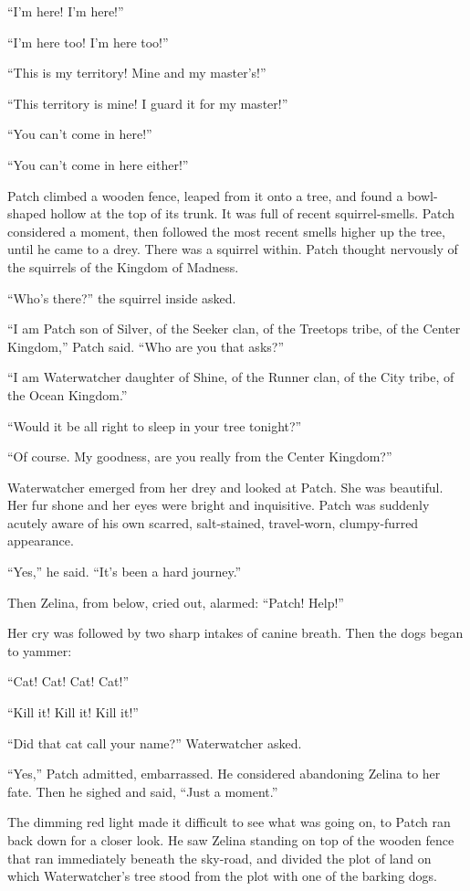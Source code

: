 \documentclass[ebook,oneside,openany,12pt]{memoir}
\begin{document}
“I’m here! I’m here!”

“I’m here too! I’m here too!”

“This is my territory! Mine and my master’s!”

“This territory is mine! I guard it for my master!”

“You can’t come in here!”

“You can’t come in here either!”

Patch climbed a wooden fence, leaped from it onto a tree, and found a
bowl-shaped hollow at the top of its trunk. It was full of recent
squirrel-smells. Patch considered a moment, then followed the most
recent smells higher up the tree, until he came to a drey. There was a
squirrel within. Patch thought nervously of the squirrels of the
Kingdom of Madness.

“Who’s there?” the squirrel inside asked.

“I am Patch son of Silver, of the Seeker clan, of the Treetops tribe,
of the Center Kingdom,” Patch said. “Who are you that asks?”

“I am Waterwatcher daughter of Shine, of the Runner clan, of the City
tribe, of the Ocean Kingdom.”

“Would it be all right to sleep in your tree tonight?”

“Of course. My goodness, are you really from the Center Kingdom?”

Waterwatcher emerged from her drey and looked at Patch. She was
beautiful. Her fur shone and her eyes were bright and
inquisitive. Patch was suddenly acutely aware of his own scarred,
salt-stained, travel-worn, clumpy-furred appearance.

“Yes,” he said. “It’s been a hard journey.”

Then Zelina, from below, cried out, alarmed: “Patch! Help!”

Her cry was followed by two sharp intakes of canine breath. Then the
dogs began to yammer:

“Cat! Cat! Cat! Cat!”

“Kill it! Kill it! Kill it!”

“Did that cat call your name?” Waterwatcher asked.

“Yes,” Patch admitted, embarrassed. He considered abandoning Zelina to
her fate. Then he sighed and said, “Just a moment.”

The dimming red light made it difficult to see what was going on, to
Patch ran back down for a closer look. He saw Zelina standing on top
of the wooden fence that ran immediately beneath the sky-road, and
divided the plot of land on which Waterwatcher’s tree stood from the
plot with one of the barking dogs.
\end{document}
